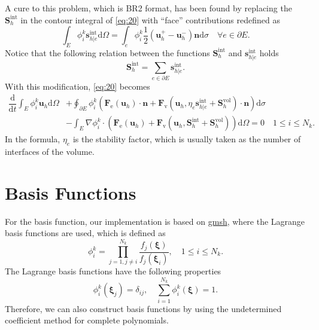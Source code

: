 \documentclass{develop-note}
\begin{document}
A cure to this problem, which is BR2 format, has been found by replacing the $\mathbf{S}_{h}^{\mathrm{int}}$ in the contour integral of \autoref{eq:20} with ``face'' contributions redefined as
\begin{equation}
  \int_{E}\phi_{i}^{k}\mathbf{s}_{h|e}^{\mathrm{int}}\mathrm{d}\Omega=\int_{e}\phi_{i}^{k}\dfrac{1}{2}(\mathbf{u}_{h}^{+}-\mathbf{u}_{h}^{-})\mathbf{n}\mathrm{d}\sigma\quad\forall e \in\partial E.
\end{equation}
Notice that the following relation between the functions $\mathbf{S}_{h}^{\mathrm{int}}$ and $\mathbf{s}_{h|e}^{\mathrm{int}}$ holds
\begin{equation}
  \mathbf{S}_{h}^{\mathrm{int}}=\sum_{e\in\partial E}\mathbf{s}_{h|e}^{\mathrm{int}}.
\end{equation}
With this modification, \autoref{eq:20} becomes
\begin{equation}
  \label{eq:23}
  \begin{aligned}
    \dfrac{\mathrm{d}}{\mathrm{d}t}\int_{E}\phi_{i}^{k}\mathbf{u}_{h}\mathrm{d}\Omega &+\oint_{\partial E}\phi_{i}^{k}(\mathbf{F}_{\mathrm{e}}(\mathbf{u}_{h})\cdot\mathbf{n}+\mathbf{F}_{\mathrm{v}}(\mathbf{u}_{h},\eta_{e}\mathbf{s}_{h|e}^{\mathrm{int}}+\mathbf{S}_{h}^{\mathrm{vol}})\cdot\mathbf{n})\mathrm{d}\sigma\\
    &-\int_{E}\nabla\phi_{i}^{k}\cdot(\mathbf{F}_{\mathrm{e}}(\mathbf{u}_{h})+\mathbf{F}_{\mathrm{v}}(\mathbf{u}_{h},\mathbf{S}_{h}^{\mathrm{int}}+\mathbf{S}_{h}^{\mathrm{vol}}))\mathrm{d}\Omega=0\quad 1\leqslant i\leqslant N_{k}.
  \end{aligned}
\end{equation}
In the formula, $\eta_{e}$ is the stability factor, which is usually taken as the number of interfaces of the volume.

\section{Basis Functions}

For the basis function, our implementation is based on \href{https://gmsh.info}{gmsh}, where the Lagrange basis functions are used, which is defined as
\begin{equation}
  \phi_{i}^{k}=\prod_{j=1,j\neq i}^{N_{k}}\dfrac{f_{j}(\bm{\xi})}{f_{j}(\bm{\xi}_{i})},\quad 1\leqslant i\leqslant N_{k}.
\end{equation}
The Lagrange basis functions have the following properties
\begin{equation}
  \phi_{i}^{k}(\bm{\xi}_{j})=\delta_{ij},\quad \sum_{i=1}^{N_{k}}\phi_{i}^{k}(\bm{\xi})=1.
\end{equation}
Therefore, we can also construct basis functions by using the undetermined coefficient method for complete polynomials.
\end{document}
